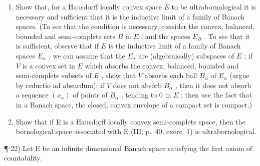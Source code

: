 \begin{enumerate}
\def\labelenumi{\arabic{enumi})}
\setcounter{enumi}{19}
\item
  Show that, for a Hausdorff locally convex space \(E\) to be ultrabornological it is necessary and sufficient that it is the inductive limit of a family of Banach spaces. (To see that the condition is necessary, consider the convex, balanced, bounded and semi-complete sets \(B\) in \(E\) , and the spaces \(E_B\) . To see that it is sufficient, observe that if \(E\) is the inductive limit of a family of Banach spaces \(E_\alpha\) , we can assume that the \(E_\alpha\) are (algebraically) subspaces of \(E\) ; if \(V\) is a convex set in \(E\) which absorbs the convex, balanced, bounded and semi-complete subsets of \(E\) , show that \(V\) absorbs each ball \(B_\alpha\) of \(E_\alpha\) (argue by reductio ad absurdum); if \(V\) does not absorb \(B_\alpha\) , then it does not absorb a sequence \((x_n)\) of points of \(B_\alpha\) , tending to 0 in \(E\) ; then use the fact that in a Banach space, the closed, convex envelope of a compact set is compact.)
\item
  Show that if E is a Hausdorff locally convex semi-complete space, then the bornological space associated with E (III, p.~40, exerc. 1) is ultrabornological.
\end{enumerate}

¶ 22) Let E be an infinite dimensional Banach space satisfying the first axiom of countability.

